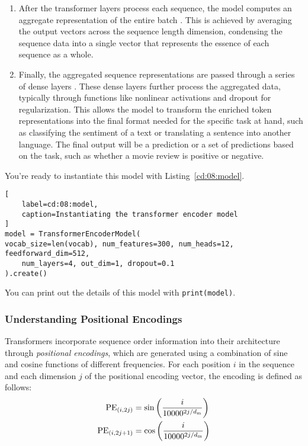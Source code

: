 \begin{enumerate}
\item After the transformer layers process each sequence, the model computes an aggregate representation of the entire batch . This is achieved by averaging the output vectors across the sequence length dimension, condensing the sequence data into a single vector that represents the essence of each sequence as a whole. 

\item Finally, the aggregated sequence representations are passed through a series of dense layers . These dense layers further process the aggregated data, typically through functions like nonlinear activations and dropout for regularization. This allows the model to transform the enriched token representations into the final format needed for the specific task at hand, such as classifying the sentiment of a text or translating a sentence into another language. The final output will be a prediction or a set of predictions based on the task, such as whether a movie review is positive or negative.
\end{enumerate}

You're ready to instantiate this model with Listing~\ref{cd:08:model}.
\begin{lstlisting}[
    label=cd:08:model,
    caption=Instantiating the transformer encoder model
]
model = TransformerEncoderModel(
vocab_size=len(vocab), num_features=300, num_heads=12, feedforward_dim=512,
    num_layers=4, out_dim=1, dropout=0.1
).create()
\end{lstlisting}
You can print out the details of this model with \lstinline{print(model)}.

\iffalse %
\subsubsection{Understanding Positional Encodings}

Transformers incorporate sequence order information into their architecture through \emph{positional encodings}, which are generated using a combination of sine and cosine functions of different frequencies. For each position $i$ in the sequence and each dimension $j$ of the positional encoding vector, the encoding is defined as follows:
\begin{align}
{\rm PE}_{(i,2j)} &= \sin\left(\frac{i}{10000^{2j/d_{\text{m}}}}\right)\\
{\rm PE}_{(i,2j+1)} &= \cos\left(\frac{i}{10000^{2j/d_{\text{m}}}}\right)
\end{align}

